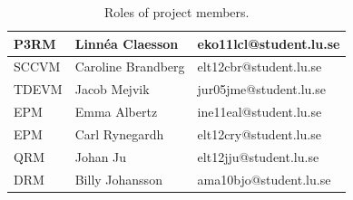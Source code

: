 \documentclass[10pt,a4paper]{article}
\begin{document}
\begin{table}[h!]
\centering
\caption{Roles of project members.}
\label{table:roles}
\begin{tabular}{|l|l|l|} \hline
P3RM & Linnéa Claesson & eko11lcl@student.lu.se\\ \hline
SCCVM & Caroline Brandberg & elt12cbr@student.lu.se\\ \hline
TDEVM & Jacob Mejvik & jur05jme@student.lu.se\\ \hline
EPM & Emma Albertz & ine11eal@student.lu.se\\ \hline
EPM & Carl Rynegardh & elt12cry@student.lu.se\\ \hline
QRM & Johan Ju & elt12jju@student.lu.se\\ \hline
DRM & Billy Johansson & ama10bjo@student.lu.se\\ \hline

\end{tabular}\\
\end{table}
\FloatBarrier
\end{document}
